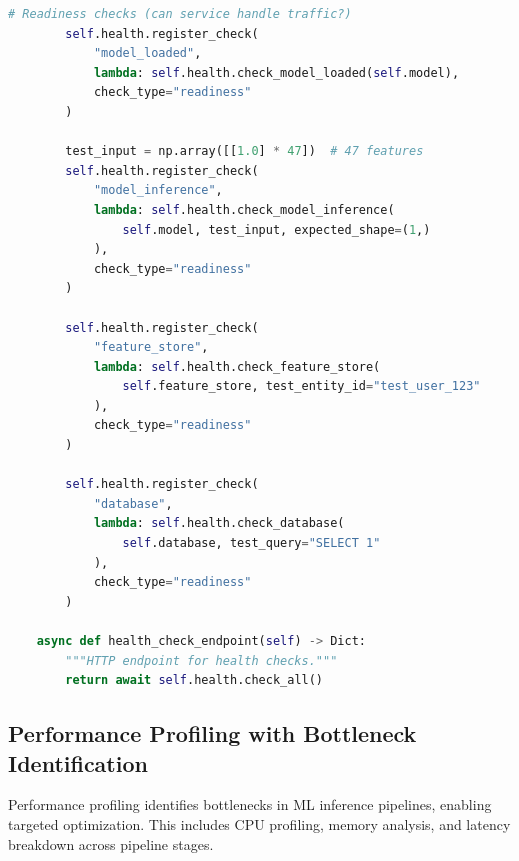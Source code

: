\begin{lstlisting}[language=Python, caption={Comprehensive HealthChecker for ML Systems}]
        # Readiness checks (can service handle traffic?)
        self.health.register_check(
            "model_loaded",
            lambda: self.health.check_model_loaded(self.model),
            check_type="readiness"
        )

        test_input = np.array([[1.0] * 47])  # 47 features
        self.health.register_check(
            "model_inference",
            lambda: self.health.check_model_inference(
                self.model, test_input, expected_shape=(1,)
            ),
            check_type="readiness"
        )

        self.health.register_check(
            "feature_store",
            lambda: self.health.check_feature_store(
                self.feature_store, test_entity_id="test_user_123"
            ),
            check_type="readiness"
        )

        self.health.register_check(
            "database",
            lambda: self.health.check_database(
                self.database, test_query="SELECT 1"
            ),
            check_type="readiness"
        )

    async def health_check_endpoint(self) -> Dict:
        """HTTP endpoint for health checks."""
        return await self.health.check_all()
\end{lstlisting}

\subsection{Performance Profiling with Bottleneck Identification}

Performance profiling identifies bottlenecks in ML inference pipelines, enabling targeted optimization. This includes CPU profiling, memory analysis, and latency breakdown across pipeline stages.


